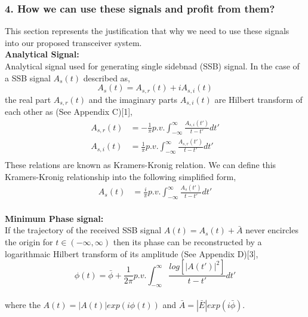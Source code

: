 \subsubsection{4. How we can use these signals and profit from them?}
This section represents the justification that why we need to use these signals into our proposed transceiver system.\\
\textbf{Analytical Signal:}\\
Analytical signal used for generating single sidebnad (SSB) signal. In the case of a SSB signal $A_s(t)$ described as,
\begin{equation}
A_s(t)=A_{s,r}(t)+iA_{s,i}(t)
\label{5.15}
\end{equation}
the real part $A_{s,r}(t)$  and the imaginary parts $A_{s,i}(t)$ are Hilbert transform of each other as (See Appendix C)[1],
\begin{equation}
\begin{split}
A_{s,r}(t) &=-\frac{1}{\pi} p.v. \int_{-\infty}^{\infty} \frac{A_{s,i}(t')}{t-t'} dt' \\
A_{s,i}(t) &=\frac{1}{\pi} p.v. \int_{-\infty}^{\infty} \frac{A_{s,r}(t')}{t-t'} dt' \\
\end{split}
\label{E}
\end{equation}
These relations are known as Kramers-Kronig relation. We can define this Kramers-Kronig relationship into the following simplified form,
\begin{equation}
\begin{split}
A_{s}(t) &=\frac{i}{\pi} p.v. \int_{-\infty}^{\infty} \frac{A_{s}(t')}{t-t'} dt' 
\end{split}
\label{Eq:5.17}
\end{equation}\\
\textbf{Minimum Phase signal:}\\
If the trajectory of the received SSB signal $A(t)=A_{s}(t)+\bar{A}$ never encircles the origin for $t\in(-\infty,\infty)$ then its phase can be reconstructed by a logarithmaic Hilbert transform of its amplitude (See Appendix D)[3],
\begin{equation}
\phi(t) = \bar{\phi} + \dfrac{1}{2\pi} p.v. \int_{-\infty}^{\infty} \dfrac{log[|A(t')|^2]}{t-t'} dt'
\end{equation}\\
where the $A(t)=|A(t)|exp(i\phi(t))$ and $\bar{A}=|\bar{E}|exp(i\bar{\phi})$.

